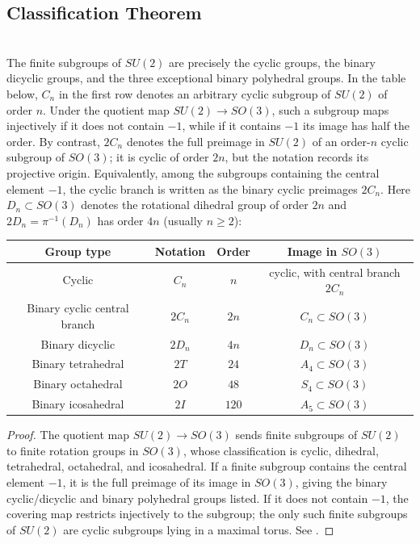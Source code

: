 \documentclass[11pt]{article}
\begin{document}
\subsection{Classification Theorem}

\begin{theorem}
\label{p1a:theorem:atlas-finite-subgroup-classification-b4f160f}

\mbox{}\\[6pt]
The finite subgroups of $SU(2)$ are precisely the cyclic groups, the binary dicyclic groups, and the three exceptional binary polyhedral groups.  In the table below, $C_n$ in the first row denotes an arbitrary cyclic subgroup of $SU(2)$ of order $n$.  Under the quotient map $SU(2)\to SO(3)$, such a subgroup maps injectively if it does not contain $-1$, while if it contains $-1$ its image has half the order.  By contrast, $2C_n$ denotes the full preimage in $SU(2)$ of an order-$n$ cyclic subgroup of $SO(3)$; it is cyclic of order $2n$, but the notation records its projective origin.  Equivalently, among the subgroups containing the central element $-1$, the cyclic branch is written as the binary cyclic preimages $2C_n$. Here $D_n\subset SO(3)$ denotes the rotational dihedral group of order $2n$ and $2D_n=\pi^{-1}(D_n)$ has order $4n$ (usually $n\ge2$):
\begin{center}
\begin{tabular}{|c|c|c|c|}
\hline
Group type & Notation & Order & Image in $SO(3)$ \\
\hline
Cyclic & $C_n$ & $n$ & cyclic, with central branch $2C_n$ \\
Binary cyclic central branch & $2C_n$ & $2n$ & $C_n \subset SO(3)$ \\
Binary dicyclic & $2D_n$ & $4n$ & $D_n \subset SO(3)$ \\
Binary tetrahedral & $2T$ & $24$ & $A_4 \subset SO(3)$ \\
Binary octahedral & $2O$ & $48$ & $S_4 \subset SO(3)$ \\
Binary icosahedral & $2I$ & $120$ & $A_5 \subset SO(3)$ \\
\hline
\end{tabular}
\end{center}
\cite{conwaysmith2003quaternions,wolf2011spaces}
\end{theorem}

\begin{proof}
The quotient map \(SU(2)\to SO(3)\) sends finite subgroups of \(SU(2)\) to finite rotation groups in \(SO(3)\), whose classification is cyclic, dihedral, tetrahedral, octahedral, and icosahedral. If a finite subgroup contains the central element \(-1\), it is the full preimage of its image in \(SO(3)\), giving the binary cyclic/dicyclic and binary polyhedral groups listed. If it does not contain \(-1\), the covering map restricts injectively to the subgroup; the only such finite subgroups of \(SU(2)\) are cyclic subgroups lying in a maximal torus. See \cite{conwaysmith2003quaternions,wolf2011spaces}.
\end{proof}
\end{document}
